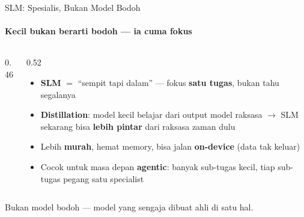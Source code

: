 \documentclass[aspectratio=169,t]{beamer}
\begin{document}
\begin{frame}{SLM: Spesialis, Bukan Model Bodoh}
  \framesubtitle{Kecil bukan berarti bodoh --- ia cuma fokus}
  \begin{columns}[T]
    \begin{column}{0.46\textwidth}
      \centering
    \end{column}
    \begin{column}{0.52\textwidth}
      \begin{itemize}
        \footnotesize
        \item \textbf{SLM} $=$ ``sempit tapi dalam'' --- fokus \textbf{satu tugas}, bukan tahu segalanya
        \item \textcolor{nvgreen}{\textbf{Distillation}}: model kecil belajar dari output model raksasa $\to$ SLM sekarang bisa \textbf{lebih pintar} dari raksasa zaman dulu
        \item Lebih \textbf{murah}, hemat memory, bisa jalan \textbf{on-device} (data tak keluar)
        \item Cocok untuk masa depan \textbf{agentic}: banyak sub-tugas kecil, tiap sub-tugas pegang satu specialist
      \end{itemize}
    \end{column}
  \end{columns}
  \vspace{0.2em}
  \begin{center}
    \textcolor{nvlightgreen}{\small Bukan model bodoh --- model yang sengaja dibuat ahli di satu hal.}
  \end{center}
\end{frame}
\end{document}
